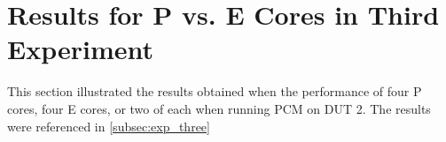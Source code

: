 \section{Results for P vs. E Cores in Third Experiment}\label{app:bonus-results}

This section illustrated the results obtained when the performance of four P cores, four E cores, or two of each when running PCM on DUT 2. The results were referenced in \cref{subsec:exp_three}


